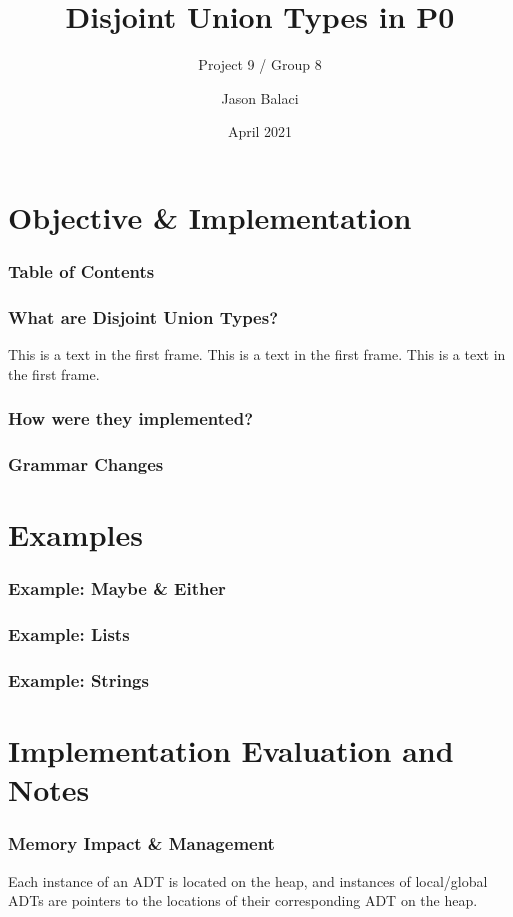 \documentclass{beamer}
\title[Disjoint Union Types]{Disjoint Union Types in P0}
\subtitle{Project 9 / Group 8}
\author{Jason Balaci}
\institute{McMaster University}
\date{April 2021}
\begin{document}
\frame{\titlepage}

\section{Objective \& Implementation}

\begin{frame}
\frametitle{Table of Contents}
\tableofcontents
\end{frame}

\begin{frame}
\frametitle{What are Disjoint Union Types?}
This is a text in the first frame. This is a text in the first frame. This is a text in the first frame.\\
\end{frame}

\begin{frame}
\frametitle{How were they implemented?}
\end{frame}

\begin{frame}
\frametitle{Grammar Changes}
\end{frame}

\section{Examples}

\begin{frame}
\frametitle{Example: Maybe \& Either}
\end{frame}

\begin{frame}
\frametitle{Example: Lists}
\end{frame}

\begin{frame}
\frametitle{Example: Strings}
\end{frame}

\section{Implementation Evaluation and Notes}

\begin{frame}
\frametitle{Memory Impact \& Management}

Each instance of an ADT is located on the heap, and instances of local/global ADTs are pointers to the locations of their corresponding ADT on the heap.

\end{frame}
\end{document}
